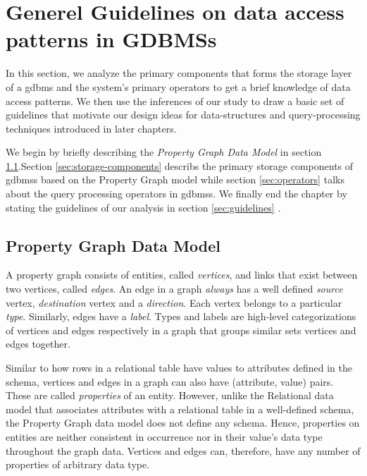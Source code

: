 \chapter{Generel Guidelines on data access patterns in GDBMSs}
\label{c:guidelines}

In this section, we analyze the primary components that forms the storage layer of a \gls{gdbms} and the system's primary operators to get a brief knowledge of data access patterns. We then use the inferences of our study to draw a basic set of guidelines that motivate our design ideas for data-structures and query-processing techniques introduced in later chapters.

We begin by briefly describing the \emph{Property Graph Data Model} in section \ref{sec:property-graph-data-model}.Section \ref{sec:storage-components} describs the primary storage components of \gls{gdbms}s based on the Property Graph model while section \ref{sec:operators} talks about the query processing operators in \gls{gdbms}s. We finally end the chapter by stating the guidelines of our analysis in section \ref{sec:guidelines} .

\section{Property Graph Data Model}
\label{sec:property-graph-data-model}

A property graph consists of entities, called \emph{vertices}, and links that exist between two vertices, called \emph{edges}. An edge in a graph \emph{always} has a well defined \emph{source} vertex, \emph{destination} vertex and a \emph{direction}. Each vertex belongs to a particular \emph{type}. Similarly, edges have a \emph{label}. Types and labels are high-level categorizations of vertices and edges respectively in a graph that groups similar sets vertices and edges together.

Similar to how rows in a relational table have values to attributes defined in the schema, vertices and edges in a graph can also have (attribute, value) pairs. These are called \emph{properties} of an entity. However, unlike the Relational data model that associates attributes with a relational table in a well-defined schema, the Property Graph data model does not define any schema. Hence, properties on entities are neither consistent in occurrence nor in their value's data type throughout the graph data. Vertices and edges can, therefore, have any number of properties of arbitrary data type.

